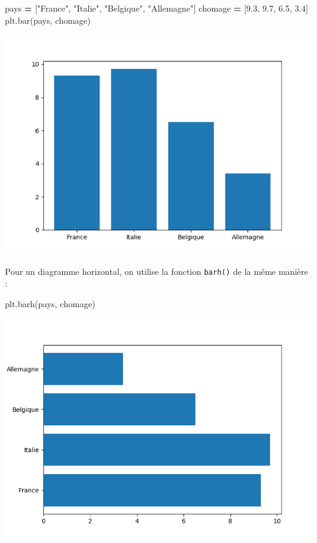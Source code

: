 \documentclass[12pt,]{book}
\newenvironment{Shaded}{\begin{snugshade}}{\end{snugshade}}
\newcommand{\FloatTok}[1]{\textcolor[rgb]{0.00,0.00,0.81}{#1}}
\newcommand{\StringTok}[1]{\textcolor[rgb]{0.31,0.60,0.02}{#1}}
\newcommand{\OperatorTok}[1]{\textcolor[rgb]{0.81,0.36,0.00}{\textbf{#1}}}
\newcommand{\NormalTok}[1]{#1}
\numberwithin{equation}{section}
\numberwithin{countremarque}{section}
\begin{document}
\begin{Shaded}
\begin{Highlighting}[]
\NormalTok{pays }\OperatorTok{=}\NormalTok{ [}\StringTok{"France"}\NormalTok{, }\StringTok{"Italie"}\NormalTok{, }\StringTok{"Belgique"}\NormalTok{, }\StringTok{"Allemagne"}\NormalTok{]}
\NormalTok{chomage }\OperatorTok{=}\NormalTok{ [}\FloatTok{9.3}\NormalTok{, }\FloatTok{9.7}\NormalTok{, }\FloatTok{6.5}\NormalTok{, }\FloatTok{3.4}\NormalTok{]}
\NormalTok{plt.bar(pays, chomage)}
\end{Highlighting}
\end{Shaded}

\begin{center}\includegraphics[width=9.03in]{figs/pyplot/barplot} \end{center}

Pour un diagramme horizontal, on utilise la fonction \texttt{barh()} de
la même manière :

\begin{Shaded}
\begin{Highlighting}[]
\NormalTok{plt.barh(pays, chomage)}
\end{Highlighting}
\end{Shaded}

\begin{center}\includegraphics[width=9.03in]{figs/pyplot/barplot_h} \end{center}
\end{document}
